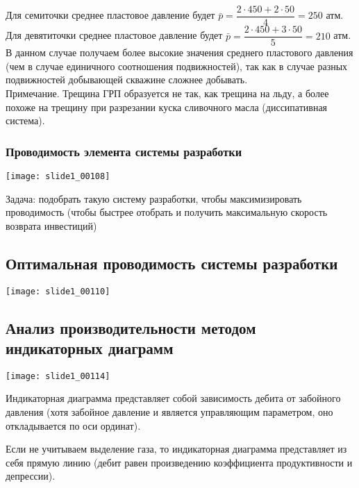 \documentclass[main.tex]{subfiles}
\begin{document}
Для семиточки среднее пластовое давление будет $\bar{p}=\dfrac{2\cdot450+2\cdot50}{4}=250$ атм.\\

Для девятиточки среднее пластовое давление будет $\bar{p}=\dfrac{2\cdot450+3\cdot50}{5}=210$ атм.\\

В данном случае получаем более высокие значения среднего пластового давления (чем в случае единичного соотношения подвижностей), так как в случае разных подвижностей добывающей скважине сложнее добывать.\\

Примечание. Трещина ГРП образуется не так, как трещина на льду, а более похоже на трещину при разрезании куска сливочного масла (диссипативная система).

\subsubsection{Проводимость элемента системы разработки}

\texttt{[image: slide1\_00108]}

Задача: подобрать такую систему разработки, чтобы максимизировать проводимость (чтобы быстрее отобрать и получить максимальную скорость возврата инвестиций)


\subsection{Оптимальная проводимость системы разработки}

\texttt{[image: slide1\_00110]}



\subsection{Анализ производительности методом индикаторных диаграмм}

\texttt{[image: slide1\_00114]}

Индикаторная диаграмма представляет собой зависимость дебита от забойного давления (хотя забойное давление и является управляющим параметром, оно откладывается по оси ординат).

Если не учитываем выделение газа, то индикаторная диаграмма представляет из себя прямую линию (дебит равен произведению коэффициента продуктивности и депрессии).
\end{document}
